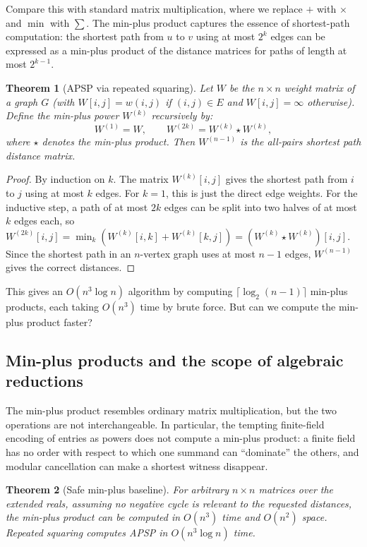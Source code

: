 \documentclass[twoside,12pt]{book}
\theoremstyle{plain}
\newtheorem{theorem}{Theorem}[chapter]
\theoremstyle{definition}
\theoremstyle{remark}
\begin{document}
Compare this with standard matrix multiplication, where we replace $+$ with $\times$ and $\min$ with $\sum$. The min-plus product captures the essence of shortest-path computation: the shortest path from $u$ to $v$ using at most $2^k$ edges can be expressed as a min-plus product of the distance matrices for paths of length at most $2^{k-1}$.

\begin{theorem}[APSP via repeated squaring]
\label{thm:apsp-squaring}
Let $W$ be the $n \times n$ weight matrix of a graph $G$ (with $W[i,j] = w(i,j)$ if $(i,j) \in E$ and $W[i,j] = \infty$ otherwise). Define the min-plus power $W^{(k)}$ recursively by:
\[
W^{(1)} = W, \qquad W^{(2k)} = W^{(k)} \star W^{(k)},
\]
where $\star$ denotes the min-plus product. Then $W^{(n-1)}$ is the all-pairs shortest path distance matrix.
\end{theorem}

\begin{proof}
By induction on $k$. The matrix $W^{(k)}[i,j]$ gives the shortest path from $i$ to $j$ using at most $k$ edges. For $k = 1$, this is just the direct edge weights. For the inductive step, a path of at most $2k$ edges can be split into two halves of at most $k$ edges each, so $W^{(2k)}[i,j] = \min_k (W^{(k)}[i,k] + W^{(k)}[k,j]) = (W^{(k)} \star W^{(k)})[i,j]$. Since the shortest path in an $n$-vertex graph uses at most $n - 1$ edges, $W^{(n-1)}$ gives the correct distances.
\end{proof}

This gives an $O(n^3 \log n)$ algorithm by computing $\lceil \log_2(n-1) \rceil$ min-plus products, each taking $O(n^3)$ time by brute force. But can we compute the min-plus product faster?

\subsection{Min-plus products and the scope of algebraic reductions}

The min-plus product resembles ordinary matrix multiplication, but the two
operations are not interchangeable. In particular, the tempting finite-field
encoding of entries as powers does not compute a min-plus product: a finite
field has no order with respect to which one summand can ``dominate'' the
others, and modular cancellation can make a shortest witness disappear.

\begin{theorem}[Safe min-plus baseline]
\label{thm:min-plus-baseline}
For arbitrary $n\times n$ matrices over the extended reals, assuming no
negative cycle is relevant to the requested distances, the min-plus product
can be computed in $O(n^3)$ time and $O(n^2)$ space. Repeated squaring
computes APSP in $O(n^3\log n)$ time.
\end{theorem}
\end{document}

